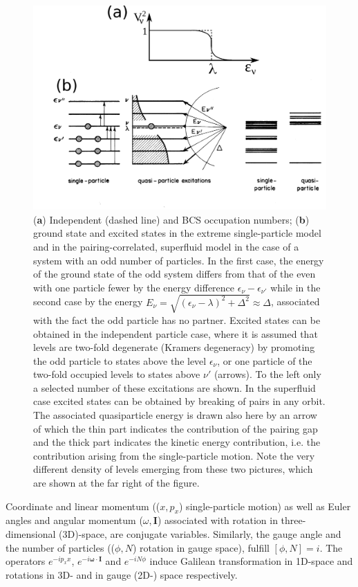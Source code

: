 \begin{figure}
	\centerline {
		\includegraphics*[width=15cm, angle=0.]{introduccion/figs/fig0_4_4_v2}
	}
	\caption{(\textbf{a}) Independent (dashed line) and BCS occupation numbers; (\textbf{b}) ground state and excited states in the extreme single-particle model and in the pairing-correlated, superfluid model in the case of a system with an odd number of particles. In the first case, the energy of the ground state of the odd system differs from that of the even with one particle fewer by the energy difference $\epsilon_\nu-\epsilon_{\nu'}$ while in the second case by the energy $E_\nu=\sqrt{(\epsilon_\nu-\lambda)^2+\Delta^2}\approx\Delta$, associated with the fact the odd particle has no partner. Excited states can be obtained in the independent particle case, where it is assumed that levels are two-fold degenerate (Kramers degeneracy) by promoting the odd particle to states above the level $\epsilon_\nu$, or one particle of the two-fold occupied levels to  states above  $\nu'$ (arrows). To the left only a selected number of these excitations are shown. In the superfluid case excited states can be obtained by breaking of pairs in any orbit. The associated quasiparticle energy is drawn also here by an arrow of which the thin part indicates the contribution of the pairing gap and the thick part indicates the kinetic energy contribution, i.e. the contribution arising from the single-particle motion. Note the very different density of levels emerging from these two pictures, which are shown at the far right of the figure.}
	\label{fig0.4.3}
\end{figure}

Coordinate and linear momentum (($x,p_x$) single-particle motion) as well as Euler angles and angular momentum ($\omega,\mathbf I$) associated with rotation in three-dimensional (3D)-space,  are conjugate variables. Similarly, the gauge angle and the number of particles (($\phi,N$) rotation in gauge space), fulfill $[\phi,N]=i$. The operators $e^{-ip_xx}$, $e^{-i\pmb\omega\cdot\mathbf I}$ and $e^{-iN\phi}$ induce Galilean transformation in 1D-space and rotations in 3D- and in gauge (2D-) space respectively. 

